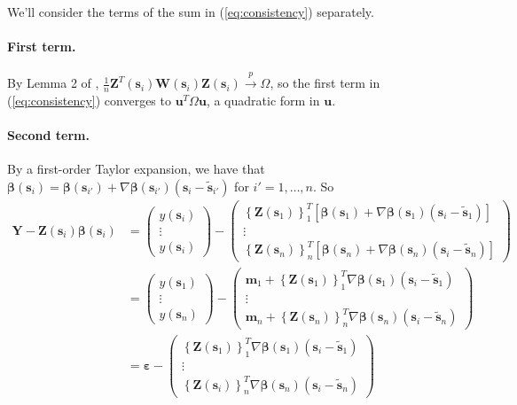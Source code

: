 \documentclass[authoryear, review, 11pt]{elsarticle}
\begin{document}
  We'll consider the terms of the sum in (\ref{eq:consistency}) separately.
  
  \paragraph{First term.} By Lemma 2 of \cite{Sun-Yan-Zhang-Lu-2014}, $\frac{1}{n} \bm{Z}^T(\bm{s}_i) \bm{W}(\bm{s}_i) \bm{Z}(\bm{s}_i) \xrightarrow{p} \Omega$, so the first term in (\ref{eq:consistency}) converges to $\bm{u}^T \Omega \bm{u}$, a quadratic form in $\bm{u}$.
  
  \paragraph{Second term.} By a first-order Taylor expansion, we have that $\bm{\beta}(\bm{s}_i) = \bm{\beta}(\bm{s}_{i'}) + \nabla \bm{\beta}(\bm{s}_{i'}) (\bm{s}_i - \tilde{\bm{s}}_{i'})$ for $i' = 1, \dots, n$. So
  \begin{align*}
    \bm{Y} - \bm{Z}(\bm{s}_i) \bm{\beta}(\bm{s}_i) &= \left( \begin{array}{c} y(\bm{s}_i) \\ \vdots \\ y(\bm{s}_i) \end{array} \right) - \left( \begin{array}{c} \left\{ \bm{Z}(\bm{s}_1) \right\}^T_1 \left[ \bm{\beta}(\bm{s}_1) + \nabla \bm{\beta}(\bm{s}_1) (\bm{s}_i - \tilde{\bm{s}}_1) \right] \\ \vdots \\ \left\{ \bm{Z}(\bm{s}_n) \right\}^T_n \left[ \bm{\beta}(\bm{s}_n) + \nabla \bm{\beta}(\bm{s}_n) (\bm{s}_i - \tilde{\bm{s}}_n) \right] \end{array} \right) \\
    &= \left( \begin{array}{c} y(\bm{s}_1) \\ \vdots \\ y(\bm{s}_n) \end{array} \right) - \left( \begin{array}{c} \bm{m}_1 + \left\{ \bm{Z}(\bm{s}_1) \right\}^T_1 \nabla \bm{\beta}(\bm{s}_1) (\bm{s}_i - \tilde{\bm{s}}_1) \\ \vdots \\ \bm{m}_n + \left\{ \bm{Z}(\bm{s}_n) \right\}^T_n \nabla \bm{\beta}(\bm{s}_n) (\bm{s}_i - \tilde{\bm{s}}_n) \end{array} \right)\\
    &= \bm{\varepsilon} - \left( \begin{array}{c} \left\{ \bm{Z}(\bm{s}_1) \right\}^T_1  \nabla \bm{\beta}(\bm{s}_1) (\bm{s}_i - \tilde{\bm{s}}_1) \\ \vdots \\ \left\{ \bm{Z}(\bm{s}_i) \right\}^T_n \nabla \bm{\beta}(\bm{s}_n) (\bm{s}_i - \tilde{\bm{s}}_n) \end{array} \right)
  \end{align*}
  
\end{document}
